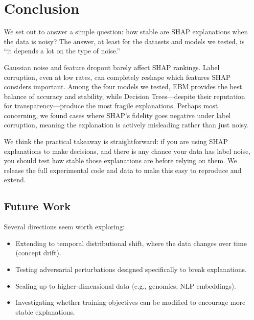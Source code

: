 \documentclass[10pt,twocolumn]{article}
\begin{document}
\section{Conclusion}\label{sec:conclusion}

We set out to answer a simple question: how stable are SHAP
explanations when the data is noisy? The answer, at least for the
datasets and models we tested, is ``it depends a lot on the type
of noise.''

Gaussian noise and feature dropout barely affect SHAP rankings.
Label corruption, even at low rates, can completely reshape which
features SHAP considers important. Among the four models we tested,
EBM provides the best balance of accuracy and stability, while
Decision Trees---despite their reputation for
transparency---produce the most fragile explanations. Perhaps most
concerning, we found cases where SHAP's fidelity goes negative under
label corruption, meaning the explanation is actively misleading
rather than just noisy.

We think the practical takeaway is straightforward: if you are using
SHAP explanations to make decisions, and there is any chance your
data has label noise, you should test how stable those explanations
are before relying on them. We release the full experimental code
and data to make this easy to reproduce and extend.

\subsection{Future Work}

Several directions seem worth exploring:
\begin{itemize}[leftmargin=*,topsep=2pt,itemsep=1pt]
  \item Extending to temporal distributional shift, where the
    data changes over time (concept drift).
  \item Testing adversarial perturbations designed specifically to
    break explanations.
  \item Scaling up to higher-dimensional data (e.g., genomics,
    NLP embeddings).
  \item Investigating whether training objectives can be modified
    to encourage more stable explanations.
\end{itemize}



\end{document}
